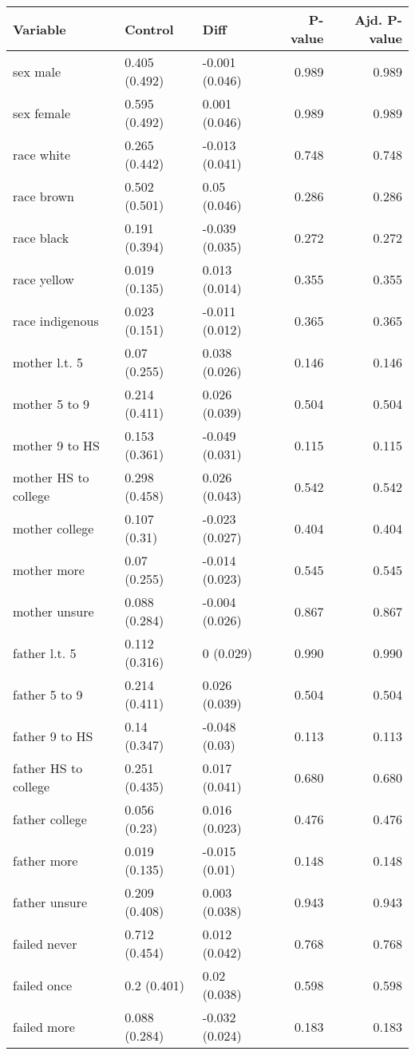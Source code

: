 \documentclass[
]{article}
\begin{document}
\begin{longtable}[t]{lllrr}
\toprule
Variable & Control & Diff & P-value & Ajd. P-value\\
\midrule\relax
sex male & 0.405 (0.492) & -0.001 (0.046) & 0.989 & 0.989\\
sex female & 0.595 (0.492) & 0.001 (0.046) & 0.989 & 0.989\\
race white & 0.265 (0.442) & -0.013 (0.041) & 0.748 & 0.748\\
race brown & 0.502 (0.501) & 0.05 (0.046) & 0.286 & 0.286\\
race black & 0.191 (0.394) & -0.039 (0.035) & 0.272 & 0.272\\
\addlinespace
race yellow & 0.019 (0.135) & 0.013 (0.014) & 0.355 & 0.355\\
race indigenous & 0.023 (0.151) & -0.011 (0.012) & 0.365 & 0.365\\
mother l.t. 5 & 0.07 (0.255) & 0.038 (0.026) & 0.146 & 0.146\\
mother 5 to 9 & 0.214 (0.411) & 0.026 (0.039) & 0.504 & 0.504\\
mother 9 to HS & 0.153 (0.361) & -0.049 (0.031) & 0.115 & 0.115\\
\addlinespace
mother HS to college & 0.298 (0.458) & 0.026 (0.043) & 0.542 & 0.542\\
mother college & 0.107 (0.31) & -0.023 (0.027) & 0.404 & 0.404\\
mother more & 0.07 (0.255) & -0.014 (0.023) & 0.545 & 0.545\\
mother unsure & 0.088 (0.284) & -0.004 (0.026) & 0.867 & 0.867\\
father l.t. 5 & 0.112 (0.316) & 0 (0.029) & 0.990 & 0.990\\
\addlinespace
father 5 to 9 & 0.214 (0.411) & 0.026 (0.039) & 0.504 & 0.504\\
father 9 to HS & 0.14 (0.347) & -0.048 (0.03) & 0.113 & 0.113\\
father HS to college & 0.251 (0.435) & 0.017 (0.041) & 0.680 & 0.680\\
father college & 0.056 (0.23) & 0.016 (0.023) & 0.476 & 0.476\\
father more & 0.019 (0.135) & -0.015 (0.01) & 0.148 & 0.148\\
\addlinespace
father unsure & 0.209 (0.408) & 0.003 (0.038) & 0.943 & 0.943\\
failed never & 0.712 (0.454) & 0.012 (0.042) & 0.768 & 0.768\\
failed once & 0.2 (0.401) & 0.02 (0.038) & 0.598 & 0.598\\
failed more & 0.088 (0.284) & -0.032 (0.024) & 0.183 & 0.183\\
\bottomrule
\end{longtable}
\end{document}
